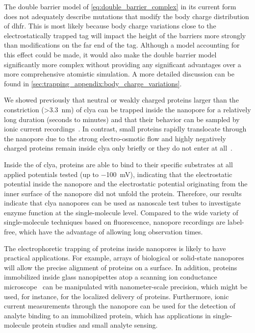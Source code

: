 The double barrier model of \cref{eq:double_barrier_complex} in its current form does not adequately describe
mutations that modify the body charge distribution of \gls{dhfr}\@. This is most likely because body charge
variations close to the electrostatically trapped tag will impact the height of the barriers more strongly
than modifications on the far end of the tag. Although a model accounting for this effect could be made, it
would also make the double barrier model significantly more complex without providing any significant
advantages over a more comprehensive atomistic simulation. A more detailed discussion can be found in
\cref{sec:trapping_appendix:body_charge_variations}.

We showed previously that neutral or weakly charged proteins larger than the \transi{} constriction
(\SI{>3.3}{\nm}) of \gls{clya} can be trapped inside the nanopore for a relatively long duration (seconds to
minutes) and that their behavior can be sampled by ionic current
recordings~\cite{Soskine-2013,Soskine-2012,Soskine-Biesemans-2015,Biesemans-2015,VanMeervelt-2014}. In
contrast, small proteins rapidly translocate through the nanopore due to the strong electro-osmotic flow and
highly negatively charged proteins remain inside \gls{clya} only briefly or they do not enter at
all~\cite{Soskine-2012}.

Inside the \lumen{} of \gls{clya}, proteins are able to bind to their specific substrates at all applied
potentials tested (up to \SI{-100}{\mV}), indicating that the electrostatic potential inside the nanopore and
the electrostatic potential originating from the inner surface of the nanopore did not unfold the protein.
Therefore, our results indicate that \gls{clya} nanopores can be used as nanoscale test tubes to investigate
enzyme function at the single-molecule level. Compared to the wide variety of single-molecule techniques based
on fluorescence, nanopore recordings are label-free, which have the advantage of allowing long observation
times.

The electrophoretic trapping of proteins inside nanopores is likely to have practical applications. For
example, arrays of biological or solid-state nanopores will allow the precise alignment of proteins on a
surface. In addition, proteins immobilized inside glass nanopipettes atop a scanning ion conductance
microscope~\cite{Bruckbauer-2007,Babakinejad-2013} can be manipulated with nanometer-scale precision, which
might be used, for instance, for the localized delivery of proteins. Furthermore, ionic current measurements
through the nanopore can be used for the detection of analyte binding to an immobilized protein, which has
applications in single-molecule protein studies and small analyte sensing.


